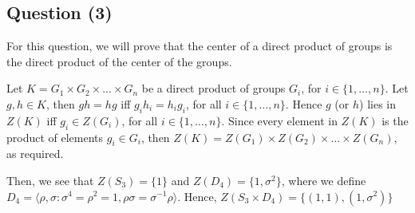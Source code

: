 \documentclass{article}
\begin{document}
\begin{center}
\section*{Question (3)}
\end{center}

\begin{flushleft}
For this question, we will prove that the center of a direct product of groups is the direct product of the center of the groups. 

Let $K = G_1 \times  G_2 \times ... \times G_n$ be a direct product of groups $G_i$, for $i \in \{1, \dotsc, n\}$. Let $g, h \in K$, then $gh = hg$ iff $g_i h_i = h_i g_i$, for all $i \in \{1, \dotsc, n\}$. Hence $g$ (or $h$) lies in $Z(K)$ iff $g_i \in Z(G_i)$, for all $i \in \{1, \dotsc, n\}$.
Since every element in $Z(K)$ is the product of elements $g_i \in G_i$, then $Z(K) = Z(G_1) \times Z(G_2) \times \dotsc \times Z(G_n)$, as required. \newline

Then, we see that $Z(S_3) = \{1\}$ and $Z(D_4) = \{1, \sigma^2\}$, where we define $D_4 = \langle \rho, \sigma : \sigma^4 = \rho^2 = 1, \rho\sigma = \sigma^{-1}\rho \rangle$. Hence, $Z(S_3 \times D_4) = \{ (1, 1), (1, \sigma^2) \}$
\end{flushleft}
\end{document}
